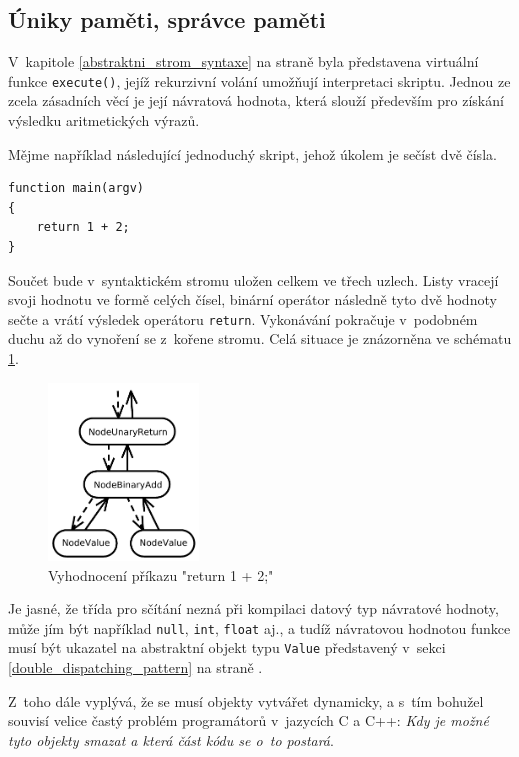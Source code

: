 \documentclass[11pt,twoside,a4paper]{book}
\begin{document}
\subsection{Úniky paměti, správce paměti}

V~kapitole \ref{abstraktni_strom_syntaxe} na straně \pageref{abstraktni_strom_syntaxe} byla představena virtuální funkce \texttt{execute()}, jejíž rekurzivní volání umožňují interpretaci skriptu. Jednou ze zcela zásadních věcí je její návratová hodnota, která slouží především pro získání výsledku aritmetických výrazů.

Mějme například následující jednoduchý skript, jehož úkolem je sečíst dvě čísla.

\begin{verbatim}
function main(argv)
{
    return 1 + 2;
}
\end{verbatim}

Součet bude v~syntaktickém stromu uložen celkem ve třech uzlech. Listy vracejí svoji hodnotu ve formě celých čísel, binární operátor následně tyto dvě hodnoty sečte a vrátí výsledek operátoru \texttt{return}. Vykonávání pokračuje v~podobném duchu až do vynoření se z~kořene stromu. Celá situace je znázorněna ve schématu \ref{fig:execute}.

\begin{figure}[ht]
\begin{center}
\includegraphics[width=4cm]{img/execute.pdf}
\caption[Vyhodnocení příkazu]{Vyhodnocení příkazu "return 1 + 2;"}
\label{fig:execute}
\end{center}
\end{figure}

Je jasné, že třída pro sčítání nezná při kompilaci datový typ návratové hodnoty, může jím být například \texttt{null}, \texttt{int}, \texttt{float} aj., a tudíž návratovou hodnotou funkce musí být ukazatel na abstraktní objekt typu \texttt{Value} představený v~sekci \ref{double_dispatching_pattern} na straně \pageref{double_dispatching_pattern}.

Z~toho dále vyplývá, že se musí objekty vytvářet dynamicky, a s~tím bohužel souvisí velice častý problém programátorů v~jazycích C a C++: \textit{Kdy je možné tyto objekty smazat a která část kódu se o~to postará}.
\end{document}
